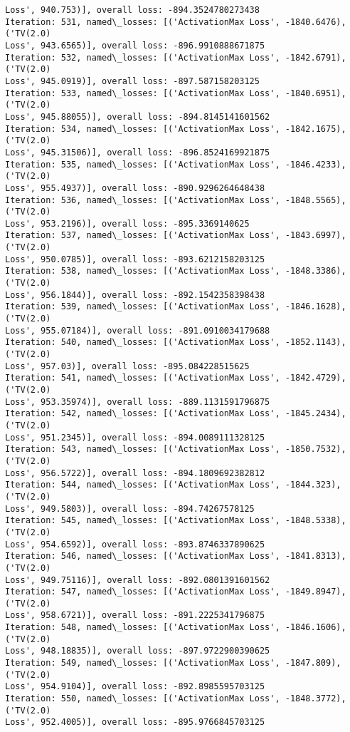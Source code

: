 \documentclass[10pt]{article}
\begin{document}
\begin{Verbatim}[commandchars=\\\{\}]
Loss', 940.753)], overall loss: -894.3524780273438
Iteration: 531, named\_losses: [('ActivationMax Loss', -1840.6476), ('TV(2.0)
Loss', 943.6565)], overall loss: -896.9910888671875
Iteration: 532, named\_losses: [('ActivationMax Loss', -1842.6791), ('TV(2.0)
Loss', 945.0919)], overall loss: -897.587158203125
Iteration: 533, named\_losses: [('ActivationMax Loss', -1840.6951), ('TV(2.0)
Loss', 945.88055)], overall loss: -894.8145141601562
Iteration: 534, named\_losses: [('ActivationMax Loss', -1842.1675), ('TV(2.0)
Loss', 945.31506)], overall loss: -896.8524169921875
Iteration: 535, named\_losses: [('ActivationMax Loss', -1846.4233), ('TV(2.0)
Loss', 955.4937)], overall loss: -890.9296264648438
Iteration: 536, named\_losses: [('ActivationMax Loss', -1848.5565), ('TV(2.0)
Loss', 953.2196)], overall loss: -895.3369140625
Iteration: 537, named\_losses: [('ActivationMax Loss', -1843.6997), ('TV(2.0)
Loss', 950.0785)], overall loss: -893.6212158203125
Iteration: 538, named\_losses: [('ActivationMax Loss', -1848.3386), ('TV(2.0)
Loss', 956.1844)], overall loss: -892.1542358398438
Iteration: 539, named\_losses: [('ActivationMax Loss', -1846.1628), ('TV(2.0)
Loss', 955.07184)], overall loss: -891.0910034179688
Iteration: 540, named\_losses: [('ActivationMax Loss', -1852.1143), ('TV(2.0)
Loss', 957.03)], overall loss: -895.084228515625
Iteration: 541, named\_losses: [('ActivationMax Loss', -1842.4729), ('TV(2.0)
Loss', 953.35974)], overall loss: -889.1131591796875
Iteration: 542, named\_losses: [('ActivationMax Loss', -1845.2434), ('TV(2.0)
Loss', 951.2345)], overall loss: -894.0089111328125
Iteration: 543, named\_losses: [('ActivationMax Loss', -1850.7532), ('TV(2.0)
Loss', 956.5722)], overall loss: -894.1809692382812
Iteration: 544, named\_losses: [('ActivationMax Loss', -1844.323), ('TV(2.0)
Loss', 949.5803)], overall loss: -894.74267578125
Iteration: 545, named\_losses: [('ActivationMax Loss', -1848.5338), ('TV(2.0)
Loss', 954.6592)], overall loss: -893.8746337890625
Iteration: 546, named\_losses: [('ActivationMax Loss', -1841.8313), ('TV(2.0)
Loss', 949.75116)], overall loss: -892.0801391601562
Iteration: 547, named\_losses: [('ActivationMax Loss', -1849.8947), ('TV(2.0)
Loss', 958.6721)], overall loss: -891.2225341796875
Iteration: 548, named\_losses: [('ActivationMax Loss', -1846.1606), ('TV(2.0)
Loss', 948.18835)], overall loss: -897.9722900390625
Iteration: 549, named\_losses: [('ActivationMax Loss', -1847.809), ('TV(2.0)
Loss', 954.9104)], overall loss: -892.8985595703125
Iteration: 550, named\_losses: [('ActivationMax Loss', -1848.3772), ('TV(2.0)
Loss', 952.4005)], overall loss: -895.9766845703125

\end{Verbatim}
\end{document}

